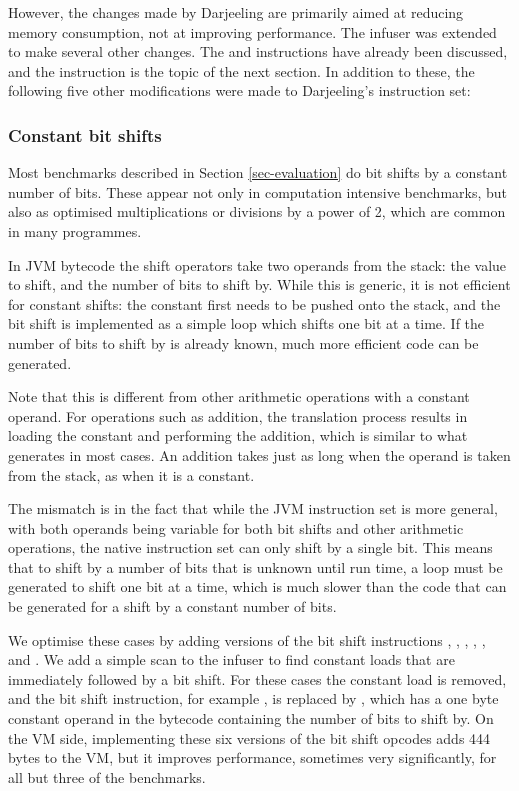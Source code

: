 However, the changes made by Darjeeling are primarily aimed at reducing memory consumption, not at improving performance. The infuser was extended to make several other changes. The  and  instructions have already been discussed, and the  instruction is the topic of the next section. In addition to these, the following five other modifications were made to Darjeeling's instruction set:

\subsubsection{Constant bit shifts}
\label{sec-opt-constant-shift}


Most benchmarks described in Section \ref{sec-evaluation} do bit shifts by a constant number of bits. These appear not only in computation intensive benchmarks, but also as optimised multiplications or divisions by a power of 2, which are common in many programmes.

In JVM bytecode the shift operators take two operands from the stack: the value to shift, and the number of bits to shift by. While this is generic, it is not efficient for constant shifts: the constant first needs to be pushed onto the stack, and the bit shift is implemented as a simple loop which shifts one bit at a time. If the number of bits to shift by is already known, much more efficient code can be generated.

Note that this is different from other arithmetic operations with a constant operand. For operations such as addition, the translation process results in loading the constant and performing the addition, which is similar to what  generates in most cases. An addition takes just as long when the operand is taken from the stack, as when it is a constant. 

The mismatch is in the fact that while the JVM instruction set is more general, with both operands being variable for both bit shifts and other arithmetic operations, the native instruction set can only shift by a single bit. This means that to shift by a number of bits that is unknown until run time, a loop must be generated to shift one bit at a time, which is much slower than the code that can be generated for a shift by a constant number of bits.

We optimise these cases by adding  versions of the bit shift instructions , , , , , and . We add a simple scan to the infuser to find constant loads that are immediately followed by a bit shift. For these cases the constant load is removed, and the bit shift instruction, for example , is replaced by , which has a one byte constant operand in the bytecode containing the number of bits to shift by. On the VM side, implementing these six  versions of the bit shift opcodes adds 444 bytes to the VM, but it improves performance, sometimes very significantly, for all but three of the benchmarks.

